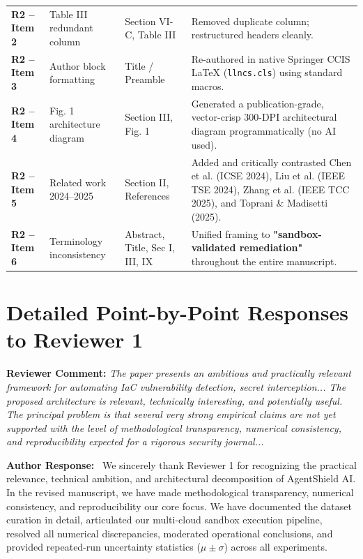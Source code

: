 \documentclass[11pt,a4paper]{article}
\newcommand{\reviewercomment}[1]{%
    \vspace{0.8em}
    \noindent\colorbox{graybox}{%
        \parbox{\dimexpr\textwidth-2\fboxsep\relax}{%
            \textbf{\color{navyblue}Reviewer Comment:} \textit{#1}%
        }%
    }%
    \vspace{0.4em}
}
\newcommand{\ourresponse}{%
    \noindent\textbf{\color{navyblue}Author Response:}\ %
}
\begin{document}
\begin{center}
\begin{tabular}{p{2.2cm}p{4.5cm}p{2.8cm}p{5.5cm}}
\textbf{R2 -- Item 2} & Table III redundant column & Section VI-C, Table III & Removed duplicate column; restructured headers cleanly. \\
\textbf{R2 -- Item 3} & Author block formatting & Title / Preamble & Re-authored in native Springer CCIS LaTeX (\texttt{llncs.cls}) using standard macros. \\
\textbf{R2 -- Item 4} & Fig. 1 architecture diagram & Section III, Fig. 1 & Generated a publication-grade, vector-crisp 300-DPI architectural diagram programmatically (no AI used). \\
\textbf{R2 -- Item 5} & Related work 2024--2025 & Section II, References & Added and critically contrasted Chen et al. (ICSE 2024), Liu et al. (IEEE TSE 2024), Zhang et al. (IEEE TCC 2025), and Toprani \& Madisetti (2025). \\
\textbf{R2 -- Item 6} & Terminology inconsistency & Abstract, Title, Sec I, III, IX & Unified framing to \textbf{"sandbox-validated remediation"} throughout the entire manuscript. \\
\hline\hline
\end{tabular}
\end{center}

\newpage

\section*{Detailed Point-by-Point Responses to Reviewer 1}

\reviewercomment{The paper presents an ambitious and practically relevant framework for automating IaC vulnerability detection, secret interception... The proposed architecture is relevant, technically interesting, and potentially useful. The principal problem is that several very strong empirical claims are not yet supported with the level of methodological transparency, numerical consistency, and reproducibility expected for a rigorous security journal...}

\ourresponse We sincerely thank Reviewer 1 for recognizing the practical relevance, technical ambition, and architectural decomposition of AgentShield AI. In the revised manuscript, we have made methodological transparency, numerical consistency, and reproducibility our core focus. We have documented the dataset curation in detail, articulated our multi-cloud sandbox execution pipeline, resolved all numerical discrepancies, moderated operational conclusions, and provided repeated-run uncertainty statistics ($\mu \pm \sigma$) across all experiments.
\end{document}
